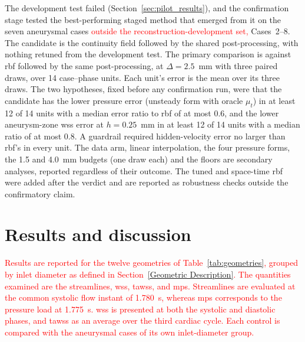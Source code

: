 \documentclass[12pt,a4paper]{article}
\newcommand{\WSS}{\ac{wss}\xspace}
\newcommand{\TAWSS}{\ac{tawss}\xspace}
\newcommand{\MPS}{\ac{mps}\xspace}
\newcommand{\RBF}{\ac{rbf}\xspace}
\theoremstyle{definition}
\numberwithin{equation}{section}
\newcommand{\revision}[1]{\textcolor{red}{#1}}
\begin{document}
The development test failed (Section~\ref{sec:pilot_results}), and the confirmation stage tested the best-performing staged method that emerged from it on the seven aneurysmal cases   \revision{outside the reconstruction-development set, } Cases~2--8. The candidate is the continuity field followed by the shared post-processing, with nothing retuned from the development test. The primary comparison is against \RBF followed by the same post-processing, at $\Delta=2.5$~mm with three paired draws, over 14 case--phase units. Each unit's error is the mean over its three draws. The two hypotheses, fixed before any confirmation run, were that the candidate has the lower pressure error (unsteady form with oracle $\mu_t$) in at least 12 of 14 units with a median error ratio to \RBF of at most 0.6, and the lower aneurysm-zone \WSS error at $h=0.25$~mm in at least 12 of 14 units with a median ratio of at most 0.8. A guardrail required hidden-velocity error no larger than \RBF's in every unit. The data arm, linear interpolation, the four pressure forms, the 1.5 and 4.0~mm budgets (one draw each) and the floors are secondary analyses, reported regardless of their outcome. The tuned and space-time \RBF were added after the verdict and are reported as robustness checks outside the confirmatory claim.

\section{\label{Results and Discussions}Results and discussion}
\label{sec:cfd_results}
\revision{Results are reported for the twelve geometries of Table~\ref{tab:geometries}, grouped by inlet diameter as defined in Section~\ref{Geometric Description}. The quantities examined are the streamlines, \WSS, \TAWSS, and \MPS. Streamlines are evaluated at the common systolic flow instant of 1.780~s, whereas \MPS corresponds to the pressure load at 1.775~s. \WSS is presented at both the systolic and diastolic phases, and \TAWSS as an average over the third cardiac cycle. Each control is compared with the aneurysmal cases of its own inlet-diameter group.}
\end{document}
